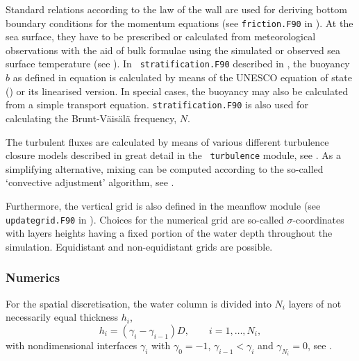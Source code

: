 Standard relations according to the law of the wall are used for
deriving bottom boundary conditions for the momentum equations (see
{\tt friction.F90} in ). At the sea surface, they
have to be prescribed or calculated from meteorological observations
with the aid of bulk formulae using the simulated or observed sea
surface temperature (see ). In {\tt
stratification.F90} described in , the
buoyancy $b$ as defined in equation  is calculated by
means of the UNESCO equation of state (\cite{FofonoffMillard83})
or its linearised version. In
special cases, the buoyancy may also be calculated from a simple
transport equation. {\tt stratification.F90} is also used for
calculating the Brunt-V\"ais\"al\"a frequency, $N$.

The turbulent fluxes are calculated by means of various different
turbulence closure models described in great detail in the {\tt
turbulence} module, see .  As a simplifying
alternative, mixing can be computed according to the so-called
`convective adjustment' algorithm, see .

Furthermore, the vertical grid is also defined in the meanflow module
(see {\tt updategrid.F90} in ). Choices for the
numerical grid are so-called $\sigma$-coordinates with layers heights
having a fixed portion of the water depth throughout the
simulation. Equidistant and non-equidistant grids are possible. 

\subsubsection{Numerics}\label{SectionNumericsMean}

For the spatial discretisation, the water column is divided into $N_i$
layers of not necessarily equal thickness $h_i$,
\begin{equation}
  \label{grid}
   h_i=(\gamma_i-\gamma_{i-1})D, \qquad i=1,\dots,N_i
   \comma
\end{equation}
with nondimensional interfaces $\gamma_i$ with $\gamma_0=-1$,
$\gamma_{i-1}< \gamma_i$ and $\gamma_{N_i}=0$,
see \cite{BurchardPetersen97}.

